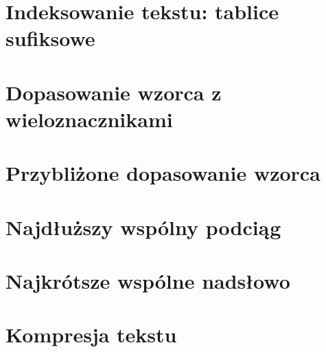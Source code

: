 \part{Indeksowanie tekstu: tablice sufiksowe}

\cleardoublepage


\part{Dopasowanie wzorca z wieloznacznikami}

\cleardoublepage


\part{Przybliżone dopasowanie wzorca}

\cleardoublepage


\part{Najdłuższy wspólny podciąg}

\cleardoublepage


\part{Najkrótsze wspólne nadsłowo}

\cleardoublepage


\part{Kompresja tekstu}

\cleardoublepage



\appendix

